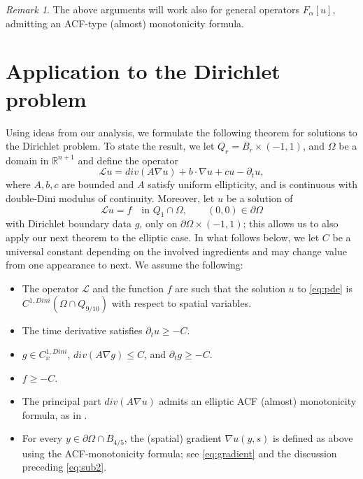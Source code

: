 \documentclass[11pt,reqno]{amsart}
\newcommand{\R}{{\mathbb R}}
\theoremstyle{plain}
\theoremstyle{remark}
\newtheorem{rem}[thm]{Remark}
\numberwithin{equation}{section}
\begin{document}
\begin{rem}
    The above arguments will work also for general operators $F_\alpha [u]$, admitting an ACF-type (almost) monotonicity formula.  
\end{rem}



\section{Application to the Dirichlet problem}



Using ideas from our analysis, we formulate the following theorem for solutions to the Dirichlet problem. To state the result, we let  $Q_r = B_r \times (-1,1)$, and $\Omega $
be a domain in $ \R^{n+1}$ and define the operator 
$$
{\mathcal L}u= div(A \nabla u) + b \cdot \nabla u + c  u -  \partial_t u ,
$$
where $A,b,c$ are bounded and $A$ satisfy uniform ellipticity, and is continuous with double-Dini modulus of continuity.
Moreover, let  $u$ be a solution of
\begin{equation}\label{eq:pde}
    {\mathcal L}u = f  \quad \text{in } Q_1 \cap \Omega,
\qquad (0,0) \in \partial \Omega
\end{equation}
with Dirichlet boundary data $g$, only on $\partial \Omega \times (-1,1)$; this allows us to also apply our next theorem to the elliptic case. In what follows below, we let $C$ be a universal constant depending on the involved ingredients and may change value from one appearance to next.
We assume the following:

\begin{itemize}
\item[(i)] The operator ${\mathcal L}$ and the function $f$ are  such that the solution $u$ to \eqref{eq:pde} is $C^{1,Dini} (\Omega  \cap Q_{9/10})$ with respect to  spatial variables.

\item[(ii)] The time derivative satisfies $\partial_t u \geq -C$.

\item[(iii)] $g \in C^{1,Dini}_x$, $div(A \nabla g) \leq C$, and $\partial_t g \geq -C$. 

\item[(iv)]  $f \geq -C  $.

\item[(v)] The principal  part $div(A \nabla u)$ admits an elliptic ACF (almost) monotonicity formula, as in \cite[Theorem IV]{Mat-Pet}.

\item[(vi)] For every $y \in \partial \Omega \cap B_{4/5}$, the (spatial) gradient $\nabla u(y,s)$ is defined as above using the ACF-monotonicity formula; see \eqref{eq:gradient} and the discussion preceding \eqref{eq:sub2}.
\end{itemize}
\end{document}

